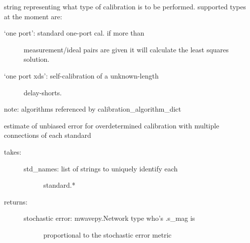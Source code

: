 \documentclass[letterpaper,10pt,english]{sphinxmanual}
\begin{document}
\begin{fulllineitems}
\begin{fulllineitems}
\end{fulllineitems}


\begin{fulllineitems}
\label{api/mwavepy.calibration:mwavepy.calibration.calibration.Calibration.type}
string representing what type of calibration is to be
performed. supported types at the moment are:
\begin{description}
\item[{`one port':     standard one-port cal. if more than}]  measurement/ideal pairs are given it will
calculate the least squares solution.

\item[{`one port xds': self-calibration of a unknown-length}] \leavevmode
delay-shorts.

\end{description}

note:
algorithms referenced by  calibration\_algorithm\_dict

\end{fulllineitems}


\begin{fulllineitems}
\label{api/mwavepy.calibration:mwavepy.calibration.calibration.Calibration.unbiased_error}
estimate of unbiased error for overdetermined calibration with
multiple connections of each standard
\begin{description}
\item[{takes:}] \leavevmode\begin{description}
\item[{std\_names: list of strings to uniquely identify each}] \leavevmode
standard.*

\end{description}

\item[{returns:}] \leavevmode\begin{description}
\item[{stochastic error: mwavepy.Network type who's .s\_mag is }] \leavevmode
proportional to the stochastic error metric

\end{description}


\end{description}
\end{fulllineitems}
\end{fulllineitems}
\end{document}
